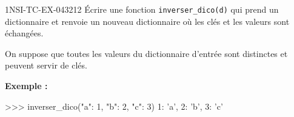\begin{exercice}{1NSI-TC-EX-043}{2}{12}
Écrire une fonction \lstinline{inverser_dico(d)} qui prend un dictionnaire et
renvoie un nouveau dictionnaire où les clés et les valeurs sont échangées.

On suppose que toutes les valeurs du dictionnaire d'entrée sont distinctes et
peuvent servir de clés.

\textbf{Exemple :}
\begin{console}
>>> inverser_dico({"a": 1, "b": 2, "c": 3})
{1: 'a', 2: 'b', 3: 'c'}
\end{console}
\end{exercice}
